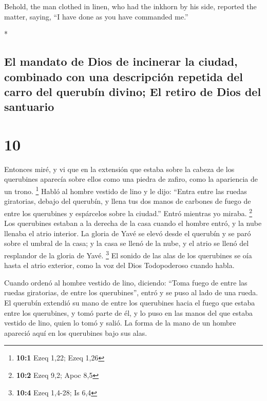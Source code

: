 \begin{paracol}{2}
\begin{otherlanguage}{english}
 Behold, the man clothed in linen, who had the inkhorn by
his side, reported the matter, saying, ``I have done as you have
commanded me.''

\end{otherlanguage}

\switchcolumn[0]*

\hypertarget{el-mandato-de-dios-de-incinerar-la-ciudad-combinado-con-una-descripciuxf3n-repetida-del-carro-del-querubuxedn-divino-el-retiro-de-dios-del-santuario}{%
\subsection{El mandato de Dios de incinerar la ciudad, combinado con una
descripción repetida del carro del querubín divino; El retiro de Dios
del
santuario}\label{el-mandato-de-dios-de-incinerar-la-ciudad-combinado-con-una-descripciuxf3n-repetida-del-carro-del-querubuxedn-divino-el-retiro-de-dios-del-santuario}}

\hypertarget{section-18}{%
\section{10}\label{section-18}}

 Entonces miré, y vi que en la extensión que estaba sobre
la cabeza de los querubines aparecía sobre ellos como una piedra de
zafiro, como la apariencia de un trono. \footnote{\textbf{10:1} Ezeq
  1,22; Ezeq 1,26}  Habló al hombre vestido de lino y le
dijo: ``Entra entre las ruedas giratorias, debajo del querubín, y llena
tus dos manos de carbones de fuego de entre los querubines y espárcelos
sobre la ciudad.'' Entró mientras yo miraba. \footnote{\textbf{10:2}
  Ezeq 9,2; Apoc 8,5}  Los querubines estaban a la derecha
de la casa cuando el hombre entró, y la nube llenaba el atrio interior.
 La gloria de Yavé se elevó desde el querubín y se paró
sobre el umbral de la casa; y la casa se llenó de la nube, y el atrio se
llenó del resplandor de la gloria de Yavé. \footnote{\textbf{10:4} Ezeq
  1,4-28; Is 6,4}  El sonido de las alas de los querubines
se oía hasta el atrio exterior, como la voz del Dios Todopoderoso cuando
habla.

 Cuando ordenó al hombre vestido de lino, diciendo: ``Toma
fuego de entre las ruedas giratorias, de entre los querubines'', entró y
se puso al lado de una rueda.  El querubín extendió su
mano de entre los querubines hacia el fuego que estaba entre los
querubines, y tomó parte de él, y lo puso en las manos del que estaba
vestido de lino, quien lo tomó y salió.  La forma de la
mano de un hombre apareció aquí en los querubines bajo sus alas.


\end{paracol}
